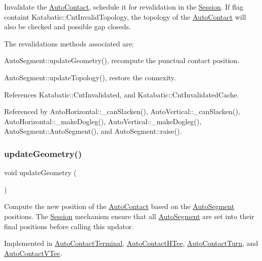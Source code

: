 Invalidate the \hyperlink{classKatabatic_1_1AutoContact}{Auto\+Contact}, schedule it for revalidation in the \hyperlink{classKatabatic_1_1Session}{Session}. If flag containt Katabatic\+::\+Cnt\+Invalid\+Topology, the topology of the \hyperlink{classKatabatic_1_1AutoContact}{Auto\+Contact} will also be checked and possible gap closeds.

The revalidations methods associated are\+:
\begin{DoxyItemize}
\item Auto\+Segment\+::update\+Geometry(), recompute the punctual contact position.
\item Auto\+Segment\+::update\+Topology(), restore the connexity. 
\end{DoxyItemize}

References Katabatic\+::\+Cnt\+Invalidated, and Katabatic\+::\+Cnt\+Invalidated\+Cache.



Referenced by Auto\+Horizontal\+::\+\_\+can\+Slacken(), Auto\+Vertical\+::\+\_\+can\+Slacken(), Auto\+Horizontal\+::\+\_\+make\+Dogleg(), Auto\+Vertical\+::\+\_\+make\+Dogleg(), Auto\+Segment\+::\+Auto\+Segment(), and Auto\+Segment\+::raise().

\mbox{\label{classKatabatic_1_1AutoContact_af6a2454547eeb7f5a519970dcb467e90}} 
\subsubsection{\texorpdfstring{update\+Geometry()}{updateGeometry()}}
{\footnotesize\ttfamily void update\+Geometry (\begin{DoxyParamCaption}{ }\end{DoxyParamCaption})\hspace{0.3cm}{\ttfamily [pure virtual]}}

Compute the new position of the \hyperlink{classKatabatic_1_1AutoContact}{Auto\+Contact} based on the \hyperlink{classKatabatic_1_1AutoSegment}{Auto\+Segment} positions. The \hyperlink{classKatabatic_1_1Session}{Session} mechanism ensure that all \hyperlink{classKatabatic_1_1AutoSegment}{Auto\+Segment} are set into their final positions before calling this updator. 

Implemented in \hyperlink{classKatabatic_1_1AutoContactTerminal_a3e218f6934c51380fb15d0e2bd380071}{Auto\+Contact\+Terminal}, \hyperlink{classKatabatic_1_1AutoContactHTee_a3e218f6934c51380fb15d0e2bd380071}{Auto\+Contact\+H\+Tee}, \hyperlink{classKatabatic_1_1AutoContactTurn_a3e218f6934c51380fb15d0e2bd380071}{Auto\+Contact\+Turn}, and \hyperlink{classKatabatic_1_1AutoContactVTee_a3e218f6934c51380fb15d0e2bd380071}{Auto\+Contact\+V\+Tee}.

